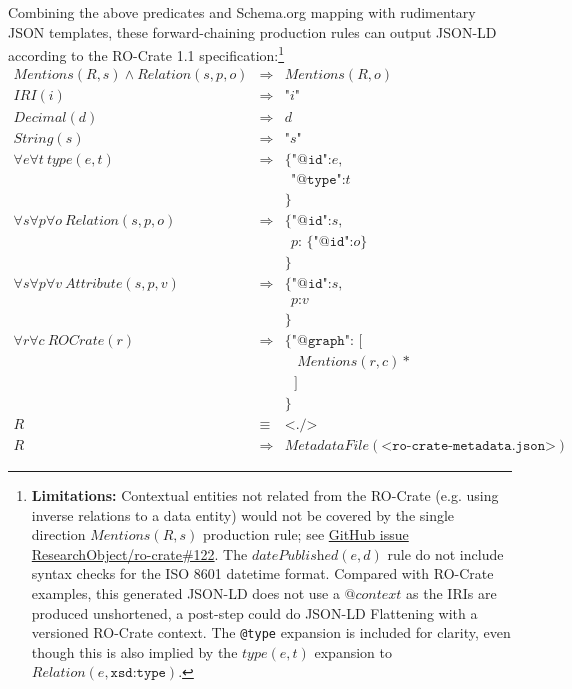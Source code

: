 \documentclass[ds,v1.1.2,openaccess]{iosart2x}%
\begin{document}
\begin{appendix}
Combining the above predicates and Schema.org mapping with rudimentary
JSON templates, these forward-chaining production rules can output
JSON-LD according to the RO-Crate 1.1 specification:\footnote{\textbf{Limitations:}
 Contextual entities not related from the
RO-Crate (e.g. using inverse relations to a data entity) would not be
covered by the single direction $Mentions(R, s)$ production rule; see
\href{https://github.com/ResearchObject/ro-crate/issues/122}{GitHub
issue ResearchObject/ro-crate\#122}. The $\textit{datePublished}(e, d)$ rule do
not include syntax checks for the ISO 8601 datetime format. Compared
with RO-Crate examples, this generated JSON-LD does not use a
$\textit{@context}$ as the IRIs are produced unshortened, a post-step could do
JSON-LD Flattening with a versioned RO-Crate context. The \texttt
{@type} expansion is included for clarity, even though this is also
implied by the $\textit{type}(e, t)$ expansion to $\textit{Relation}(e, \texttt{xsd:type})$.}
%
\begin{eqnarray*}
\textit{Mentions}(R, s) \land \textit{Relation}(s,p,o) & \Rightarrow&
\textit{Mentions}(R, o)
\\
\textit{IRI}(i) & \Rightarrow& \texttt{"} i \texttt{"}
\\
\textit{Decimal}(d) & \Rightarrow& d
\\
\textit{String}(s) & \Rightarrow& \texttt{"} s \texttt{"}
\\
\forall e \forall t \ \textit{type}(e, t) & \Rightarrow& \texttt{\{"@id":} e
\texttt{,}
\\
&& \ \ \texttt{"@type":} t
\\
&& \texttt{\}}
\\
\forall s \forall p \forall o \ \textit{Relation}(s,p,o) & \Rightarrow& \texttt{
\{"@id":} s \texttt{,}
\\
&& \ \ p \texttt{: \{ "@id":} o \texttt{\}}
\\
&& \texttt{\}}
\\
\forall s \forall p \forall v \ \textit{Attribute}(s,p,v) & \Rightarrow&
\texttt{\{"@id":} s \texttt{,}
\\
&& \ \ p \texttt{:} v
\\
&& \texttt{\}}
\\
\forall r \forall c\ \textit{ROCrate}(r) & \Rightarrow& \texttt{\{
"@graph": [}
\\
&& \ \ \ \ \textit{Mentions}(r, c)*
\\
&& \ \ \ \texttt{]}
\\
&& \texttt{\}}
\\
R & \equiv& \texttt{<./>}
\\
R & \Rightarrow& \textit{MetadataFile}(\texttt{<ro-crate-metadata.json>})
\end{eqnarray*}


\end{appendix}
\end{document}
